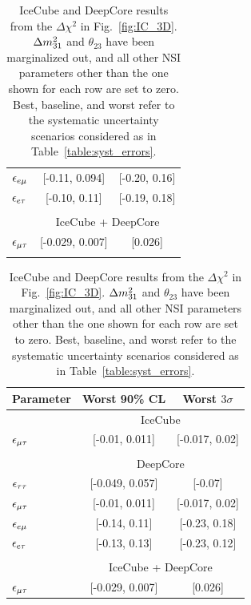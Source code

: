 {{\begin{table}
\begin{center}
\begin{tabular}{lcc}
         $\epsilon_{e\mu}$ &  [-0.11, 0.094] &  [-0.20, 0.16]    \\
         $\epsilon_{e\tau}$ &    [-0.10, 0.11] &  [-0.19, 0.18]  \\\\
         &\multicolumn{2}{c}{IceCube + DeepCore}\\
         $\epsilon_{\mu\tau}$ &   [-0.029, 0.007] &          [0.026] \\
         \hline
         \vspace{2em}
      \end{tabular}
      \begin{tabular}{lcc}
         \hline
         Parameter & Worst 90\% CL & Worst $3\sigma$\\
         \hline & \multicolumn{2}{c}{IceCube}  \\
         $\epsilon_{\mu\tau}$ &   [-0.01, 0.011] &   [-0.017, 0.02] \\\\
         & \multicolumn{2}{c}{DeepCore}\\ [0.3em]
         $\epsilon_{\tau\tau}$ &    [-0.049, 0.057] &          [-0.07] \\
         $\epsilon_{\mu\tau}$ &     [-0.01, 0.011] &   [-0.017, 0.02] \\
         $\epsilon_{e\mu}$ &   [-0.14, 0.11] &   [-0.23, 0.18] \\
         $\epsilon_{e\tau}$ &   [-0.13, 0.13] &  [-0.23, 0.12] \\\\
         &\multicolumn{2}{c}{IceCube + DeepCore}\\
         $\epsilon_{\mu\tau}$ &   [-0.029, 0.007] &          [0.026] \\
         \hline
      \end{tabular}
      \caption{IceCube and DeepCore results from the $\Delta \chi^2$ in Fig.~\ref{fig:IC_3D}. $\dm[31]$ and $\theta_{23}$ have been marginalized out, and all other NSI parameters other than the one shown for each row are set to zero. Best, baseline, and worst refer to 
      the systematic uncertainty scenarios considered as in Table~\ref{table:syst_errors}.}\label{table:IC_DC_results}
   \end{center}
\end{table}

}}

